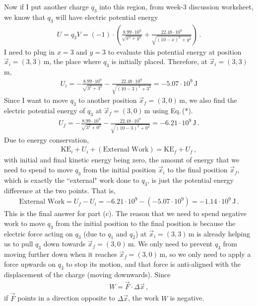 \documentclass[11pt]{article}
\begin{document}
Now if I put another charge $q_3$ into this region, from week-3 discussion worksheet, we know that $q_3$ will have electric potential energy 
\begin{align*}
U = q_3V = (-1)\cdot \left(\frac{8.99 \cdot 10^9}{\sqrt{x^2+y^2}}+ \frac{22.48 \cdot 10^9}{\sqrt{(10-x)^2+y^2}}\right)\,. \tag{*}
\end{align*}
I need to plug in $x = 3$ and $y=3$ to evaluate this potential energy at position $\vec{x}_i = (3,3)\,$m, the place where $q_3$ is initially placed. Therefore, at $\vec{x}_i = (3,3)$\,m, 
\begin{align*}
U_i = -\frac{8.99 \cdot 10^9}{\sqrt{3^2+3^2}}-\frac{22.48 \cdot 10^9}{\sqrt{(10-3)^2+3^2}} = -5.07\cdot 10^9\, \text{J}
\end{align*}
Since I want to move $q_3$ to another position $\vec{x}_f = (3,0)$\,m, we also find the electric potential energy of $q_3$ at $\vec{x}_f = (3,0)$\,m using Eq.\,(*). 
\begin{align*}
U_f = -\frac{8.99 \cdot 10^9}{\sqrt{3^2+0^2}}-\frac{22.48 \cdot 10^9}{\sqrt{(10-3)^2+0^2}} = -6.21 \cdot 10^9\,\text{J}\,.
\end{align*}
Due to energy conservation, 
\begin{align*}
\text{KE}_i+ U_i + (\text{External Work})= \text{KE}_f+ U_f\,,
\end{align*}
with initial and final kinetic energy being zero, the amount of energy that we need to spend to move $q_3$ from the initial position $\vec{x}_i$ to the final position $\vec{x}_f$, which is exactly the ``external" work done to $q_3$, is just the potential energy difference at the two points. That is, 
\begin{align*}
\text{External Work} = U_f - U_i = -6.21 \cdot 10^9 - (-5.07\cdot 10^9) = -1.14\cdot 10^9\,\text{J}\,.
\end{align*}
This is the final answer for part (c). The reason that we need to spend negative work to move $q_3$ from the initial position to the final position is because the electric force acting on $q_3$ (due to $q_1$ and $q_2$) at $\vec{x}_i = (3,3)\,$m is already helping us to pull $q_3$ down towards $\vec{x}_f = (3,0)$\,m. We only need to prevent $q_3$ from moving further down when it reaches  $\vec{x}_f = (3,0)$\,m, so we only need to apply a force upwards on $q_3$ to stop its motion, and that force is anti-aligned with the displacement of the charge (moving downwards). Since 
\begin{align*}
W = \vec{F}\cdot \Delta \vec{x}\,,
\end{align*} 
if $\vec{F}$ points in a direction opposite to $\Delta \vec{x}$, the work $W$ is negative.\\
\end{document}
